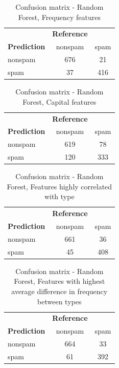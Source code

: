 \documentclass{article}\usepackage[]{graphicx}\usepackage[]{xcolor}
\begin{document}
\begin{table}[h]
    \centering
    \begin{tabular}{lcc}
        & \textbf{Reference} & \\
        \textbf{Prediction} & nonspam & spam \\
        nonspam & 676 & 21 \\
        spam & 37 & 416 \\
    \end{tabular}
    \caption{Confusion matrix - Random Forest, Frequency features}
    \label{RFcm2}
\end{table}

\begin{table}[h]
    \centering
    \begin{tabular}{lcc}
        & \textbf{Reference} & \\
        \textbf{Prediction} & nonspam & spam \\
        nonspam & 619 & 78 \\
        spam & 120 & 333 \\
    \end{tabular}
    \caption{Confusion matrix - Random Forest, Capital features}
    \label{RFcm3}
\end{table}

\begin{table}[h]
    \centering
    \begin{tabular}{lcc}
        & \textbf{Reference} & \\
        \textbf{Prediction} & nonspam & spam \\
        nonspam & 661 & 36 \\
        spam & 45 & 408 \\
    \end{tabular}
    \caption{Confusion matrix - Random Forest, Features highly correlated with type}
    \label{RFcm4}
\end{table}

\begin{table}[h]
    \centering
    \begin{tabular}{lcc}
        & \textbf{Reference} & \\
        \textbf{Prediction} & nonspam & spam \\
        nonspam & 664 & 33 \\
        spam & 61 & 392 \\
    \end{tabular}
    \caption{Confusion matrix - Random Forest, Features with highest average difference in frequency between types}
    \label{RFcm5}
\end{table}
\end{document}
